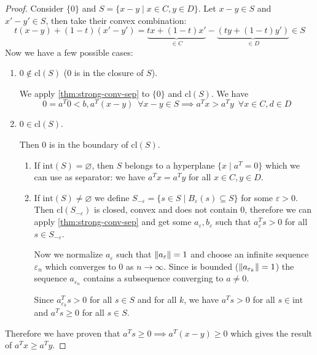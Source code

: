 \documentclass[12pt]{extarticle}
\begin{document}
\begin{proof}
	Consider $\{0\}$ and $S = \{x - y \mid x \in C, y \in D\}$.
	Let $x - y \in S$ and $x' - y' \in S$, then take their convex combination:
	\begin{equation}
		t(x - y) + (1-t)(x'-y') =
		\underbrace{tx + (1-t)x'}_{\in C} - \underbrace{(ty + (1-t)y')}_{\in D} \in S
	\end{equation}
	Now we have a few possible cases:
	\begin{enumerate}
		\item $0 \notin \mathrm{cl}(S)$ ($0$ is in the closure of $S$).

		      We apply \cref{thm:strong-conv-sep} to $\{0\}$ and $\mathrm{cl}(S)$.
		      We have
		      \begin{equation}
			      0 = a^T 0 < b , a^T(x-y) \enspace \forall x-y \in S
			      \implies a^T x > a^T y \enspace \forall x \in C, d \in D
		      \end{equation}

		\item $0 \in \mathrm{cl}(S)$.

		      Then $0$ is in the boundary of $\mathrm{cl}(S)$.
		      \begin{enumerate}
			      \item If $\mathrm{int}(S) = \varnothing$, then $S$ belongs to a hyperplane
			            $\{x \mid a^T = 0 \}$ which we can use as separator: we have
			            $a^T x =  a^T y$ for all $x \in C, y \in D$.

			      \item If $\mathrm{int}(S) \neq \varnothing$ we define
			            $S_{-\varepsilon} = \{s \in S \mid B_\varepsilon(s) \subseteq S\}$
			            for some $\varepsilon > 0$.
			            Then $\mathrm{cl}(S_{-\varepsilon})$ is closed, convex and does not contain $0$,
			            therefore we can apply \cref{thm:strong-conv-sep}
			            and get some $a_\varepsilon, b_\varepsilon$ such that
			            $a_\varepsilon^T s > 0$ for all $s \in S_{-\varepsilon}$.

			            Now we normalize $a_\varepsilon$ such that $\norm{a_\varepsilon} = 1$
			            and choose an infinite sequence $\varepsilon_n$
			            which converges to $0$ as $n\to\infty$.
			            Since is bounded ($\norm{a_{\varepsilon_k}} = 1$) the sequence $a_{\varepsilon_n}$
			            contains a subsequence converging to $a\neq 0$.

			            Since $a_{\varepsilon_k}^T s > 0$ for all $s \in S$ and for all $k$, we have
			            $a^T s > 0$ for all $s \in \mathrm{int}$ and $a^T s \geq 0$ for all $s \in S$.
		      \end{enumerate}
	\end{enumerate}
	Therefore we have proven that $a^Ts \geq 0 \implies a^T(x-y) \geq 0$ which gives the result of
	$a^T x \geq a^T y$.
\end{proof}
\end{document}
